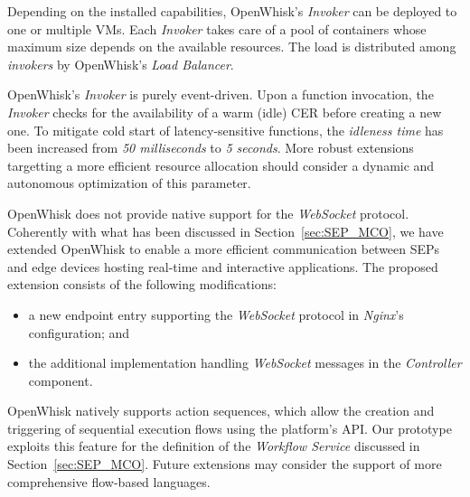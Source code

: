

Depending on the installed capabilities, OpenWhisk's \textit{Invoker} can be deployed to one or multiple VMs. Each \textit{Invoker} takes care of a pool of containers whose maximum size depends on the available resources. The load is distributed among \textit{invokers} by OpenWhisk's \textit{Load Balancer}.

OpenWhisk's \textit{Invoker} is purely event-driven. Upon a function invocation, the \textit{Invoker} checks for the availability of a warm (idle) CER before creating a new one. To mitigate cold start of latency-sensitive functions, the \textit{idleness time} has been increased from \textit{50 milliseconds} to \textit{5 seconds}. More robust extensions targetting a more efficient resource allocation should consider a dynamic and autonomous optimization of this parameter.

OpenWhisk does not provide native support for the \textit{WebSocket} protocol. Coherently with what has been discussed in Section~\ref{sec:SEP_MCO}, we have extended OpenWhisk to enable a more efficient communication between SEPs and edge devices hosting real-time and interactive applications. The proposed extension consists of the following modifications: 

\begin{itemize}
    
    \item a new endpoint entry supporting the \textit{WebSocket} protocol in \textit{Nginx}'s configuration; and
    
    \item the additional implementation handling \textit{WebSocket} messages in the \textit{Controller} component.
    
\end{itemize}


OpenWhisk natively supports action sequences, which allow the creation and triggering of sequential execution flows using the platform's API. Our prototype exploits this feature for the definition of the \textit{Workflow Service} discussed in Section~\ref{sec:SEP_MCO}. Future extensions may consider the support of more comprehensive flow-based languages. %


